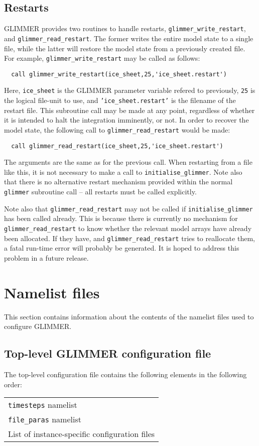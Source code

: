 \subsection{Restarts}
%
GLIMMER provides two routines to handle restarts,
\texttt{glimmer\_write\_restart}, and \texttt{glimmer\_read\_restart}. The
former writes the entire model state to a single file, while the latter will
restore the model state from a previously created
file. For example, \texttt{glimmer\_write\_restart} may be called as follows:
%
\begin{verbatim}
  call glimmer_write_restart(ice_sheet,25,'ice_sheet.restart')
\end{verbatim}
%
Here, \texttt{ice\_sheet} is the GLIMMER parameter variable refered to
previously, \texttt{25} is the logical file-unit to use, and
\texttt{'ice\_sheet.restart'} is the filename of the restart file. This
subroutine call may be made at any point, regardless of whether it is intended
to halt the integration imminently, or not. In order to recover the model
state, the following call to \texttt{glimmer\_read\_restart} would be made:
%
\begin{verbatim}
  call glimmer_read_restart(ice_sheet,25,'ice_sheet.restart')
\end{verbatim}
%
The arguments are the same as for the previous call. When restarting from a
file like this, it is not necessary to make a call to
\texttt{initialise\_glimmer}. Note also that there is no alternative restart mechanism
provided within the normal \texttt{glimmer} subroutine call -- all restarts
must be called explicitly.

Note also that \texttt{glimmer\_read\_restart} may not be called if
\texttt{initialise\_glimmer} has been called already. This is because there is
currently no mechanism for \texttt{glimmer\_read\_restart} to know whether the
relevant model arrays have already been allocated. If they have, and
\texttt{glimmer\_read\_restart} tries to reallocate them, a fatal
run-time error will probably be generated. It is hoped to address this problem
in a future release.
%
\section{Namelist files}
%
This section contains information about the contents of the namelist files
used to configure GLIMMER.
%
\subsection{Top-level GLIMMER configuration file}
%
The top-level configuration file contains the following elements in the
following order:
\begin{center}
\begin{tabular}{l}
\texttt{timesteps} namelist \\
\texttt{file\_paras} namelist \\
List of instance-specific configuration files \\
\end{tabular}
\end{center}
%
